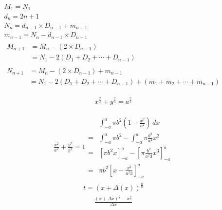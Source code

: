 \documentclass{article}
\begin{document}
\begin{gather*}
  M_1 = N_1 \\
  d_n = 2n + 1 \\
  N_n = d_{n-1} \times D_{n-1} + m_{n-1} \\
  m_{n-1} = N_n - d_{n-1} \times D_{n-1} \\
  \begin{aligned}
    M_{n+1} &= M_n - ( 2 \times D_{n-1} ) \\
            &= N_1 - 2 ( D_1 + D_2 + \cdots + D_{n-1} )
  \end{aligned} \\
  \begin{aligned}
    N_{n+1} &= M_n - ( 2 \times D_{n-1} ) + m_{n-1} \\
            &= N_1 - 2( D_1 + D_2 + \cdots + D_{n-1} ) + ( m_1 + m_2 + \cdots + m_{n-1} )
  \end{aligned}
\end{gather*}

\begin{gather*}
  x^{\frac{2}{3}} + y^{\frac{2}{3}} = a^{\frac{2}{3}}
\end{gather*}

\begin{gather*}
  \frac{x^{2}}{a^{2}} + \frac{y^{2}}{b^{2}} = 1
  \begin{align*}
  &\int_{-a}^{a} \pi b^{2}\left(1 - \frac{x^{2}}{a^{2}} \right) \,dx \\
  =&\int_{-a}^{a}\pi b^{2} -  \int_{-a}^{a}\pi \frac{b^{2}}{a^{2}}x^{2} \\
  =&\left[\pi b^{2} x\right]_{-a}^{a} -  \left[\pi \frac{b^{2}}{a^{2}3} x^{3} \right]_{-a}^{a} \\
  =&\pi b^{2} \left[ x - \frac{x^{3}}{a^{2}3} \right]_{-a}^{a}
  \end{align*}
\end{gather*}
\begin{align*}
  t = \left( x + \Delta(x) \right)^{\frac{a}{b}}
\end{align*}
\begin{align*}
  \frac{\left( x + \Delta{x} \right)^{\frac{a}{b}} - x^{\frac{a}{b}}}{\Delta{x}}
\end{align*}
\end{document}
